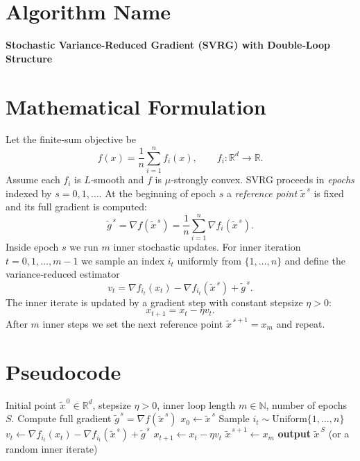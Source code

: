 \documentclass[11pt]{article}
\newcommand{\R}{\mathbb{R}}
\begin{document}
\section*{Algorithm Name}
\textbf{Stochastic Variance‑Reduced Gradient (SVRG) with Double‑Loop Structure}

\section*{Mathematical Formulation}
Let the finite‑sum objective be
\[
f(x)=\frac{1}{n}\sum_{i=1}^{n} f_i(x),\qquad f_i:\R^{d}\to\R .
\]
Assume each $f_i$ is $L$‑smooth and $f$ is $\mu$‑strongly convex.
SVRG proceeds in \emph{epochs} indexed by $s=0,1,\dots$.  
At the beginning of epoch $s$ a \emph{reference point} $\tilde{x}^{\,s}$ is fixed and its full gradient is computed:
\[
\tilde{g}^{\,s}= \nabla f(\tilde{x}^{\,s}) = \frac{1}{n}\sum_{i=1}^{n}\nabla f_i(\tilde{x}^{\,s}).
\]
Inside epoch $s$ we run $m$ inner stochastic updates.  
For inner iteration $t=0,1,\dots,m-1$ we sample an index $i_t$ uniformly from $\{1,\dots,n\}$ and define the variance‑reduced estimator
\[
v_t = \nabla f_{i_t}(x_t)-\nabla f_{i_t}(\tilde{x}^{\,s})+\tilde{g}^{\,s}.
\]
The inner iterate is updated by a gradient step with constant stepsize $\eta>0$:
\[
x_{t+1}=x_t-\eta v_t .
\]
After $m$ inner steps we set the next reference point $\tilde{x}^{\,s+1}=x_m$ and repeat.

\section*{Pseudocode}
\begin{algorithm}[H]
\caption{SVRG (double‑loop)}\label{alg:svrg}
\begin{algorithmic}[1]
\Require Initial point $\tilde{x}^{\,0}\in\R^{d}$, stepsize $\eta>0$, inner loop length $m\in\mathbb{N}$, number of epochs $S$.
    \State Compute full gradient $\tilde{g}^{\,s}= \nabla f(\tilde{x}^{\,s})$ 
    \State $x_0 \gets \tilde{x}^{\,s}$
        \State Sample $i_t\sim\text{Uniform}\{1,\dots,n\}$
        \State $v_t \gets \nabla f_{i_t}(x_t)-\nabla f_{i_t}(\tilde{x}^{\,s})+\tilde{g}^{\,s}$
        \State $x_{t+1}\gets x_t-\eta v_t$
    \EndFor
    \State $\tilde{x}^{\,s+1}\gets x_m$
\EndFor
\State \textbf{output} $\tilde{x}^{\,S}$ (or a random inner iterate)
\end{algorithmic}
\end{algorithm}
\end{document}
